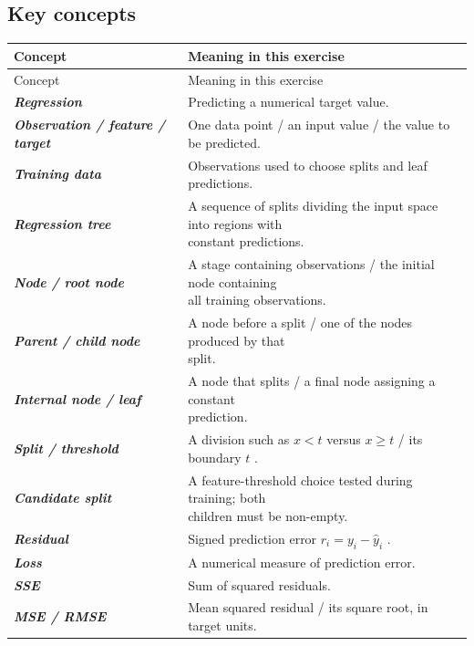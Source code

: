 \documentclass[10pt]{article}
\begin{document}
\subsection*{Key concepts}
\begingroup
\small
\setlength{\tabcolsep}{4pt}
\begin{longtable}{l|l}
Concept & Meaning in this exercise \\
\hline
\endfirsthead
Concept & Meaning in this exercise \\
\hline
\endhead
\textbf{\textit{Regression}} & Predicting a numerical target value. \\[1.5pt]
\textbf{\textit{Observation / feature / target}} & One data point / an input value / the value to be predicted. \\[1.5pt]
\textbf{\textit{Training data}} & Observations used to choose splits and leaf predictions. \\[1.5pt]
\textbf{\textit{Regression tree}} & \shortstack[l]{A sequence of splits dividing the input space into regions with \\ constant predictions.} \\[1.5pt]
\textbf{\textit{Node / root node}} & \shortstack[l]{A stage containing observations / the initial node containing \\ all training observations.} \\[1.5pt]
\textbf{\textit{Parent / child node}} & \shortstack[l]{A node before a split / one of the nodes produced by that \\ split.} \\[1.5pt]
\textbf{\textit{Internal node / leaf}} & \shortstack[l]{A node that splits / a final node assigning a constant \\ prediction.} \\[1.5pt]
\textbf{\textit{Split / threshold}} & A division such as $x<t$ versus $x\geq t$ / its boundary $t$ . \\[1.5pt]
\textbf{\textit{Candidate split}} & \shortstack[l]{A feature-threshold choice tested during training; both \\ children must be non-empty.} \\[1.5pt]
\textbf{\textit{Residual}} & Signed prediction error $r_i=y_i-\hat y_i$ . \\[1.5pt]
\textbf{\textit{Loss}} & A numerical measure of prediction error. \\[1.5pt]
\textbf{\textit{SSE}} & Sum of squared residuals. \\[1.5pt]
\textbf{\textit{MSE / RMSE}} & Mean squared residual / its square root, in target units. \\[1.5pt]

\end{longtable}
\end{document}
